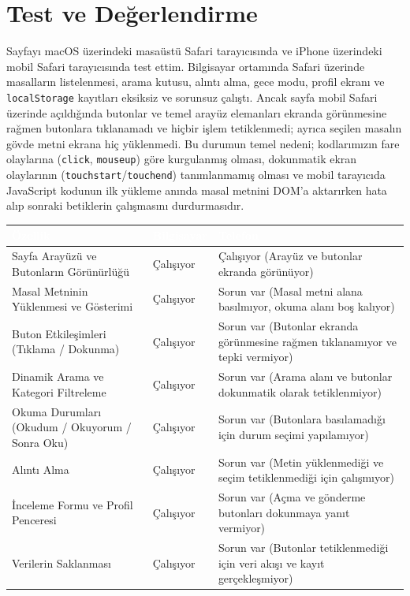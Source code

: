\documentclass[12pt,a4paper]{article}
\begin{document}
\section{Test ve Değerlendirme}
Sayfayı macOS üzerindeki masaüstü Safari tarayıcısında ve iPhone üzerindeki mobil Safari tarayıcısında test ettim. Bilgisayar ortamında Safari üzerinde masalların listelenmesi, arama kutusu, alıntı alma, gece modu, profil ekranı ve \texttt{localStorage} kayıtları eksiksiz ve sorunsuz çalıştı. Ancak sayfa mobil Safari üzerinde açıldığında butonlar ve temel arayüz elemanları ekranda görünmesine rağmen butonlara tıklanamadı ve hiçbir işlem tetiklenmedi; ayrıca seçilen masalın gövde metni ekrana hiç yüklenmedi. Bu durumun temel nedeni; kodlarımızın fare olaylarına (\texttt{click}, \texttt{mouseup}) göre kurgulanmış olması, dokunmatik ekran olaylarının (\texttt{touchstart}/\texttt{touchend}) tanımlanmamış olması ve mobil tarayıcıda JavaScript kodunun ilk yükleme anında masal metnini DOM'a aktarırken hata alıp sonraki betiklerin çalışmasını durdurmasıdır.

\begin{center}
\begin{tabular}{@{}p{6.5cm}p{2.5cm}p{5.5cm}@{}}
\toprule
\rowcolor{ana}\textcolor{white}{\textbf{Özellik}} & \textcolor{white}{\textbf{Bilgisayar}} & \textcolor{white}{\textbf{Telefon}} \\
\midrule
Sayfa Arayüzü ve Butonların Görünürlüğü & Çalışıyor & Çalışıyor (Arayüz ve butonlar ekranda görünüyor) \\
Masal Metninin Yüklenmesi ve Gösterimi & Çalışıyor & Sorun var (Masal metni alana basılmıyor, okuma alanı boş kalıyor) \\
Buton Etkileşimleri (Tıklama / Dokunma) & Çalışıyor & Sorun var (Butonlar ekranda görünmesine rağmen tıklanamıyor ve tepki vermiyor) \\
Dinamik Arama ve Kategori Filtreleme & Çalışıyor & Sorun var (Arama alanı ve butonlar dokunmatik olarak tetiklenmiyor) \\
Okuma Durumları (Okudum / Okuyorum / Sonra Oku) & Çalışıyor & Sorun var (Butonlara basılamadığı için durum seçimi yapılamıyor) \\
Alıntı Alma & Çalışıyor & Sorun var (Metin yüklenmediği ve seçim tetiklenmediği için çalışmıyor) \\
İnceleme Formu ve Profil Penceresi & Çalışıyor & Sorun var (Açma ve gönderme butonları dokunmaya yanıt vermiyor) \\
Verilerin Saklanması & Çalışıyor & Sorun var (Butonlar tetiklenmediği için veri akışı ve kayıt gerçekleşmiyor) \\
\bottomrule
\end{tabular}
\end{center}
\end{document}
